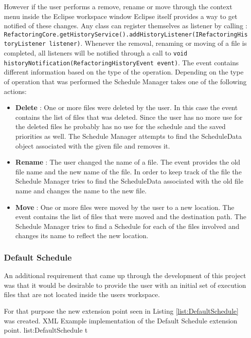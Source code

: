 However if the user performs a remove, rename or move through the context menu inside the Eclipse workspace window
Eclipse itself provides a way to get notified of these changes. Any class can register themselves as listener
by calling : 
\lstinline|RefactoringCore.getHistoryService().addHistoryListener(IRefactoringHistoryListener listener)|.
Whenever the removal, renaming or moving of a file is completed, all listeners will be notified through a call to
\lstinline|void historyNotification(RefactoringHistoryEvent event)|. The event contains different information
based on the type of the operation. Depending on the type of operation that was performed the Schedule Manager
takes one of the following actions:
\begin{itemize}
 \item \textbf{Delete} : One or more files were deleted by the user. In this case the event contains the list
of files that was deleted. Since the user has no more use for the deleted files he probably has no use for
the schedule and the saved priorities as well. The Schedule Manager attempts to find the ScheduleData object
associated with the given file and removes it.
 \item \textbf{Rename} : The user changed the name of a file. The event provides the old file name and the 
new name of the file. In order to keep track of the file the Schedule Manager tries to find the ScheduleData
associated with the old file name and changes the name to the new file.
 \item \textbf{Move} : One or more files were moved by the user to a new location. The event contains the list
of files that were moved and the destination path. The Schedule Manager tries to find a Schedule for each
of the files involved and changes its name to reflect the new location.
\end{itemize}


\subsubsection{Default Schedule}
\label{section:DefaultSchedule}
An additional requirement that came up through the development of this project was that it would
be desirable to provide the user with an initial set of execution files that are not located inside
the users workspace.

For that purpose the new extension point seen in Listing \ref{list:DefaultSchedule} was created.
\listingxml
{}
{XML}
{Example implementation of the Default Schedule extension point.}
{list:DefaultSchedule}
{t}

